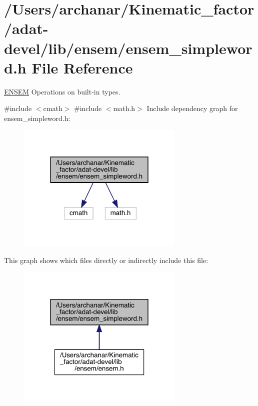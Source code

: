 \hypertarget{adat-devel_2lib_2ensem_2ensem__simpleword_8h}{}\section{/\+Users/archanar/\+Kinematic\+\_\+factor/adat-\/devel/lib/ensem/ensem\+\_\+simpleword.h File Reference}
\label{adat-devel_2lib_2ensem_2ensem__simpleword_8h}


\mbox{\hyperlink{namespaceENSEM}{E\+N\+S\+EM}} Operations on built-\/in types.  


{\ttfamily \#include $<$cmath$>$}\newline
{\ttfamily \#include $<$math.\+h$>$}\newline
Include dependency graph for ensem\+\_\+simpleword.\+h\+:
\nopagebreak
\begin{figure}[H]
\begin{center}
\leavevmode
\includegraphics[width=226pt]{dc/dac/adat-devel_2lib_2ensem_2ensem__simpleword_8h__incl}
\end{center}
\end{figure}
This graph shows which files directly or indirectly include this file\+:
\nopagebreak
\begin{figure}[H]
\begin{center}
\leavevmode
\includegraphics[width=226pt]{d6/d7a/adat-devel_2lib_2ensem_2ensem__simpleword_8h__dep__incl}
\end{center}
\end{figure}
